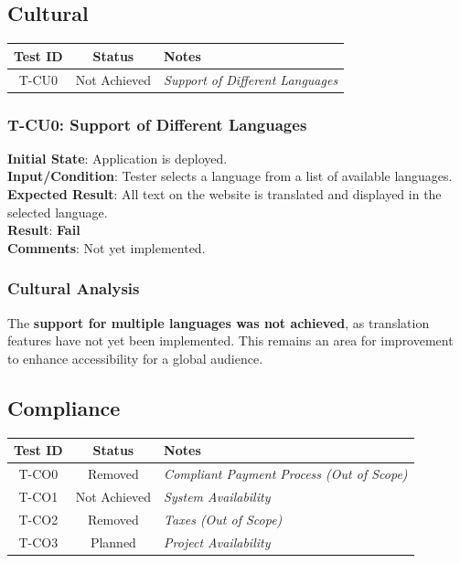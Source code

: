 \documentclass[12pt, titlepage]{article}
\begin{document}
\subsection{Cultural}
\begin{longtable}{|c|c|l|}
    \hline
    \textbf{Test ID} & \textbf{Status} & \textbf{Notes} \\
    \hline
    T-CU0 & Not Achieved & \textit{Support of Different Languages} \\
    \hline
\end{longtable}

\subsubsection{T-CU0: Support of Different Languages}
\textbf{Initial State}: Application is deployed.\\
\textbf{Input/Condition}: Tester selects a language from a list of available languages.\\
\textbf{Expected Result}: All text on the website is translated and displayed in the selected language.\\
\textbf{Result}: \textbf{Fail}\\
\textbf{Comments}: Not yet implemented.

\subsubsection{Cultural Analysis}
The \textbf{support for multiple languages was not achieved}, as translation features have not yet been implemented. This remains an area for improvement to enhance accessibility for a global audience.
\subsection{Compliance}
\begin{longtable}{|c|c|l|}
    \hline
    \textbf{Test ID} & \textbf{Status} & \textbf{Notes} \\
    \hline
    T-CO0 & Removed & \textit{Compliant Payment Process (Out of Scope)} \\
    T-CO1 & Not Achieved & \textit{System Availability} \\
    T-CO2 & Removed & \textit{Taxes (Out of Scope)} \\
    T-CO3 & Planned & \textit{Project Availability} \\
    \hline
\end{longtable}
\end{document}
